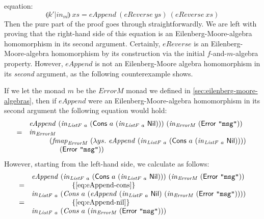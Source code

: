 \documentclass{jfp1}
\newcommand{\eFold}[2]{\llparenthesis #1|#2 \rrparenthesis}
\newcommand{\eqAnnotation}[1]{\hspace{2cm}\left\{\textrm{#1}\right\}}
\begin{document}
equation:
\begin{displaymath}
  \eFold{k'}{\mathit{in}_m}~\mathit{xs} = \mathit{eAppend}~(\mathit{eReverse}~\mathit{ys})~(\mathit{eReverse}~\mathit{xs})
\end{displaymath}
Then the pure part of the proof goes through straightforwardly. We are
left with proving that the right-hand side of this equation is an
Eilenberg-Moore-algebra homomorphism in its second
argument. Certainly, $\mathit{eReverse}$ is an Eilenberg-Moore-algebra
homomorphism by its construction via the initial $f$-and-$m$-algebra
property. However, $\mathit{eAppend}$ is not an Eilenberg-Moore
algebra homomorphism in its \emph{second} argument, as the following
counterexample shows.

If we let the monad $m$ be the $\mathit{ErrorM}$ monad we defined in
\autoref{sec:eilenberg-moore-algebras}, then if $\mathit{eAppend}$
were an Eilenberg-Moore-algebra homomorphism in its second argument
the following equation would hold:
\begin{equation}\label{eq:purported-em}
  \begin{array}{cl}
    &\mathit{eAppend}~(\mathit{in}_{\mathit{ListF}~a}~(\mathsf{Cons}~a~(\mathit{in}_{\mathit{ListF}~a}~\mathsf{Nil})))~(\mathit{in}_{\mathit{ErrorM}}~(\mathsf{Error}~\texttt{"msg"}))
    \\ =&\mathit{in}_{\mathit{ErrorM}}~\\ & \hspace{1cm}(\mathit{fmap}_{\mathit{ErrorM}}~(\lambda
    ys.~\mathit{eAppend}~(\mathit{in}_{\mathit{ListF}~a}~(\mathsf{Cons}~a~(\mathit{in}_{\mathit{ListF}~a}~\mathsf{Nil}))))~\\ & \hspace{1.5cm}(\mathsf{Error}~\texttt{"msg"}))
  \end{array}
\end{equation}
However, starting from the left-hand side, we calculate as follows:
\begin{displaymath}
  \begin{array}{cl}
    & \mathit{eAppend}~(\mathit{in}_{\mathit{ListF}~a}~(\mathsf{Cons}~a~(\mathit{in}_{\mathit{ListF}~a}~\mathsf{Nil})))~(\mathit{in}_{\mathit{ErrorM}}~(\mathsf{Error}~\texttt{"msg"})) \\
    =&\eqAnnotation{\autoref{eq:eAppend-cons}} \\
    & \mathit{in}_{\mathit{ListF}~a}~(\mathit{Cons}~a~(\mathit{eAppend}~(\mathit{in}_{\mathit{ListF}~a}~\mathsf{Nil})~(\mathit{in}_{\mathit{ErrorM}}~(\mathsf{Error}~\texttt{"msg"})))) \\
    =&\eqAnnotation{\autoref{eq:eAppend-nil}} \\
    & \mathit{in}_{\mathit{ListF}~a}~(\mathit{Cons}~a~(\mathit{in}_{\mathit{ErrorM}}~(\mathsf{Error}~\texttt{"msg"})))
  \end{array}
\end{displaymath}
\end{document}
